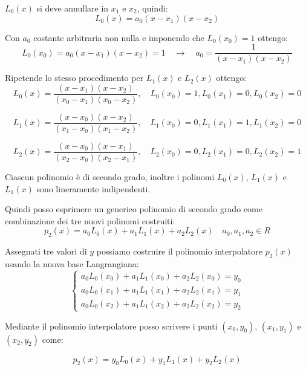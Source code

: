 $L_0(x)$ si deve annullare in $x_1$ e $x_2$, quindi:
\begin{equation}
 L_0(x) = a_0(x - x_1)(x - x_2)
\end{equation}

Con $a_0$ costante arbitraria non nulla e imponendo che $L_0(x_0) = 1$ ottengo:
\begin{equation}
  L_0(x_0) = a_0(x - x_1)(x - x_2) = 1 \quad \rightarrow \quad a_0 = \displaystyle\frac{1}{(x - x_1)(x - x_2) }
\end{equation}

Ripetende lo stesso procedimento per $L_1(x)$ e $L_2(x)$ ottengo:
\begin{equation}
 L_0(x) = \displaystyle\frac{(x - x_1)(x - x_2)}{(x_0 - x_1)(x_0 - x_2)}, \quad L_0(x_0) = 1, L_0(x_1) = 0, L_0(x_2) = 0
\end{equation}

\begin{equation}
 L_1(x) = \displaystyle\frac{(x - x_0)(x - x_2)}{(x_1 - x_0)(x_1 - x_2)}, \quad L_1(x_0) = 0, L_1(x_1) = 1, L_1(x_2) = 0
\end{equation}

\begin{equation}
 L_2(x) = \displaystyle\frac{(x - x_0)(x - x_1)}{(x_2 - x_0)(x_2 - x_1)}, \quad L_2(x_0) = 0, L_2(x_1) = 0, L_2(x_2) = 1
\end{equation}


Ciascun polinomio è di secondo grado, inoltre i polinomi $L_0(x)$, $L_1(x)$ e $L_1(x)$ sono lineramente indipendenti.

Quindi posso esprimere un generico polinomio di secondo grado come combinazione dei tre nuovi polinomi costruiti:
\begin{equation}
 p_2(x) = a_0L_0(x) + a_1L_1(x) + a_2L_2(x) \quad a_0, a_1, a_2 \in R
\end{equation}

Assegnati tre valori di $y$ possiamo costruire il polinomio interpolatore $p_2(x)$ usando la nuova base Langrangiana:
\begin{equation}
  \begin{cases}
        a_0L_0(x_0) + a_1L_1(x_0) + a_2L_2(x_0) = y_0 \\ 
        a_0L_0(x_1) + a_1L_1(x_1) + a_2L_2(x_1) = y_1\\ 
        a_0L_0(x_2) + a_1L_1(x_2) + a_2L_2(x_2) = y_2
  \end{cases}
\end{equation}

Mediante il polinomio interpolatore posso scrivere i punti $(x_0, y_0)$, $(x_1, y_1)$ e $(x_2, y_2)$ come:

\begin{equation}
  p_2(x) = y_0L_0(x) + y_1L_1(x) + y_2L_2(x)
\end{equation}
